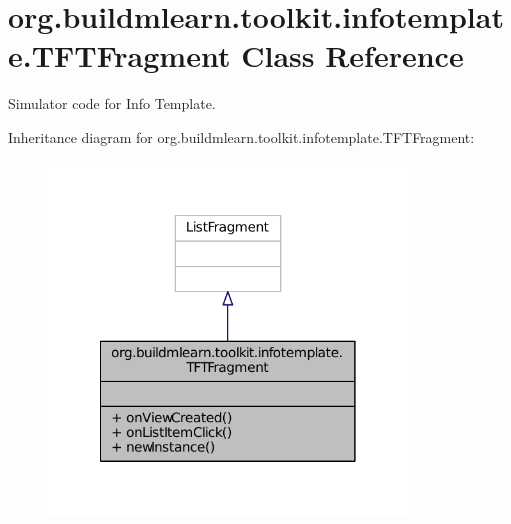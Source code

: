 \hypertarget{classorg_1_1buildmlearn_1_1toolkit_1_1infotemplate_1_1TFTFragment}{\section{org.\-buildmlearn.\-toolkit.\-infotemplate.\-T\-F\-T\-Fragment Class Reference}
\label{classorg_1_1buildmlearn_1_1toolkit_1_1infotemplate_1_1TFTFragment}
}


Simulator code for Info Template.  




Inheritance diagram for org.\-buildmlearn.\-toolkit.\-infotemplate.\-T\-F\-T\-Fragment\-:
\nopagebreak
\begin{figure}[H]
\begin{center}
\leavevmode
\includegraphics[width=270pt]{db/de4/classorg_1_1buildmlearn_1_1toolkit_1_1infotemplate_1_1TFTFragment__inherit__graph}
\end{center}
\end{figure}


